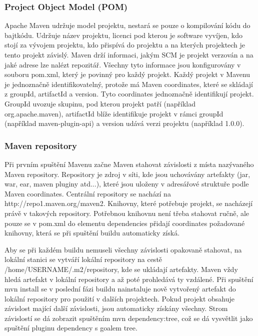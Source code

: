 \documentclass[11pt,twoside,a4paper]{book}
\begin{document}
\subsubsection{Project Object Model (POM)}

Apache Maven udržuje model projektu, nestará se pouze o kompilování kódu do bajtkódu.
Udržuje název projektu, licenci pod kterou je software vyvíjen, kdo stojí za vývojem projektu,
kdo přispívá do projektu a na kterých projektech je tento projekt závislý. Maven drží
informaci, jakým SCM je projekt verzován a na jaké adrese lze nalézt repozitář. Všechny tyto
informace jsou konfigurovány v souboru pom.xml, který je povinný pro každý projekt. Každý
projekt v Mavenu je jednoznačně identifikovatelný, protože má Maven coordinates, které se
skládají z groupId, artifactId a version. Tyto coordinates jednoznačně identifikují projekt.
GroupId uvozuje skupinu, pod kterou projekt patří (například org.apache.maven), artifactId
blíže identifikuje projekt v rámci groupId (například maven-plugin-api) a version udává verzi
projektu (například 1.0.0).

\subsubsection{Maven repository}

Při prvním spuštění Mavenu začne Maven stahovat závislosti z místa nazývaného Maven
repository. Repository je zdroj v síti, kde jsou uchovávány artefakty (jar, war, ear, maven
pluginy atd...), které jsou uloženy v adresářové struktuře podle Maven coordinates. Centrální
repository se nachází na http://repo1.maven.org/maven2. Knihovny, které potřebuje projekt,
se nacházejí právě v takových repository. Potřebnou knihovnu není třeba stahovat ručně, ale
pouze se v pom.xml do elementu dependencies přidají coordinates požadované knihovny,
která se při spuštění buildu automaticky získá.

Aby se při každém buildu nemuseli všechny závislosti opakovaně stahovat, na lokální stanici
se vytváří lokální repository na cestě /home/USERNAME/.m2/repository, kde se ukládají
artefakty. Maven vždy hledá artefakt v lokální repository a až poté prohledává ty vzdálené. Při
spuštění mvn install se v poslední fázi buildu nainstaluje nově vytvořený artefakt do lokální
repository pro použití v dalších projektech. Pokud projekt obsahuje závislost mající další
závislosti, jsou automaticky získány všechny. Strom závislostí se dá zobrazit spuštěním mvn
dependency:tree, což se dá vysvětlit jako spuštění pluginu dependency s goalem tree.
\end{document}
